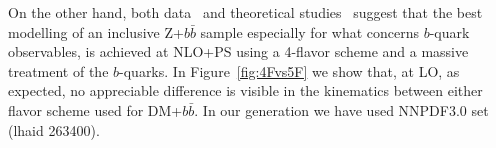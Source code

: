 On the other hand, both data~\cite{Chatrchyan:2014dha,Chatrchyan:2013zja,CMS:2015mba} 
and theoretical studies~\cite{Frederix:2011qg,Wiesemann:2014ioa} suggest that the best modelling of  an 
inclusive Z+$b\bar{b}$ sample especially for what concerns $b$-quark observables, is achieved at NLO+PS using a 4-flavor scheme 
and a massive treatment of the $b$-quarks.  
In Figure~\ref{fig:4Fvs5F} we show that, at LO, as expected, no appreciable difference is visible in the kinematics between 
either flavor scheme used for DM+$b\bar{b}$. In our generation we have used  NNPDF3.0 set (lhaid 263400).



